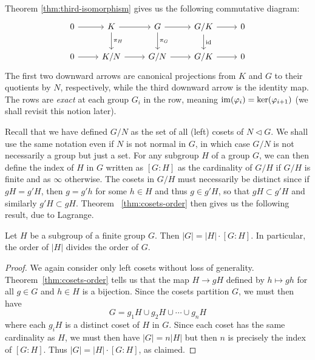 Theorem \ref{thm:third-isomorphism} gives us the following commutative diagram:
\[
    \begin{tikzcd}
        0 \arrow[r] & K \arrow[r] \arrow[d, "\pi_H"] & G \arrow[r] \arrow[d, "\pi_G"] & G/K \arrow[r] \arrow[d, "\id"] & 0 \\
        0 \arrow[r] & K/N \arrow[r]                  & G/N \arrow[r]                  & G/K \arrow[r]                  & 0
    \end{tikzcd}
\]
The first two downward arrows are canonical projections from \(K\) and \(G\) to
their quotients by \(N\), respectively, while the third downward arrow is the
identity map. The rows are \emph{exact} at each group \(G_i\) in the row,
meaning \(\operatorname{im}(\varphi_i) = \ker(\varphi_{i+1})\) (we shall revisit this notion
later).

\bigskip

Recall that we have defined \(G/N\) as the set of all (left) cosets of \(N
\triangleleft G\). We shall use the same notation even if \(N\) is not normal in
\(G\), in which case \(G/N\) is not necessarily a group but just a set. For any
subgroup \(H\) of a group \(G\), we can then define the index of \(H\) in \(G\)
written as \([G : H]\) as the cardinality of \(G/H\) if \(G/H\) is finite and as
\(\infty\) otherwise. The cosets in \(G/H\) must necessarily be distinct since
if \(gH = g'H\), then \(g = g'h\) for some \(h \in H\) and thus \(g \in g'H\),
so that \(gH \subset g'H\) and similarly \(g'H \subset gH\). Theorem~
\ref{thm:cosets-order} then gives us the following result, due to Lagrange.

\begin{theorem}
    Let \(H\) be a subgroup of a finite group \(G\). Then \(|G| = |H| \cdot [G :
    H]\). In particular, the order of \(|H|\) divides the order of \(G\).
\end{theorem}

\begin{proof}
    We again consider only left cosets without loss of generality.
    Theorem~\ref{thm:cosets-order} tells us that the map \(H \to gH\) defined by
    \(h \mapsto gh\) for all \(g \in G\) and \(h \in H\) is a bijection. Since
    the cosets partition \(G\), we must then have
    \[
        G = g_1H \cup g_2H \cup \cdots \cup g_nH
    \]
    where each \(g_iH\) is a distinct coset of \(H\) in \(G\). Since each coset
    has the same cardinality as \(H\), we must then have \(|G| = n|H|\) but then
    \(n\) is precisely the index of \([G : H]\). Thus \(|G| = |H| \cdot [G :
    H]\), as claimed.
\end{proof}

